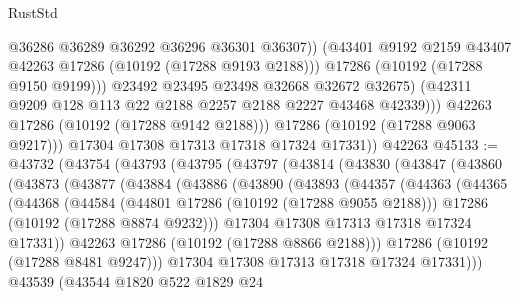 \begin{lexlean}{RustStd}
\begin{coremodule}
                        @36286
                        @36289
                        @36292
                        @36296
                        @36301
                        @36307))
                    (@43401 @9192 @2159 @43407 @42263 @17286 (@10192 (@17288 @9193 @2188)))
                    @17286
                    (@10192 (@17288 @9150 @9199)))
                  @23492
                  @23495
                  @23498
                  @32668
                  @32672
                  @32675)
                (@42311 @9209 @128 @113 @22 @2188 @2257 @2188 @2227 @43468 @42339)))
            @42263
            @17286
            (@10192 (@17288 @9142 @2188)))
          @17286
          (@10192 (@17288 @9063 @9217)))
        @17304
        @17308
        @17313
        @17318
        @17324
        @17331))
    @42263
@45133 := @43732
    (@43754
      (@43793
        (@43795
          (@43797
            (@43814
              (@43830
                (@43847
                  (@43860
                    (@43873
                      (@43877
                        (@43884
                          (@43886
                            (@43890
                              (@43893
                                (@44357
                                  (@44363
                                    (@44365
                                      (@44368
                                        (@44584
                                          (@44801 @17286 (@10192 (@17288 @9055 @2188)))
                                          @17286
                                          (@10192 (@17288 @8874 @9232)))
                                        @17304
                                        @17308
                                        @17313
                                        @17318
                                        @17324
                                        @17331))
                                    @42263
                                    @17286
                                    (@10192 (@17288 @8866 @2188)))
                                  @17286
                                  (@10192 (@17288 @8481 @9247)))
                                @17304
                                @17308
                                @17313
                                @17318
                                @17324
                                @17331)))
                          @43539
                          (@43544
                            @1820
                            @522
                            @1829
                            @24

\end{coremodule}
\end{lexlean}
